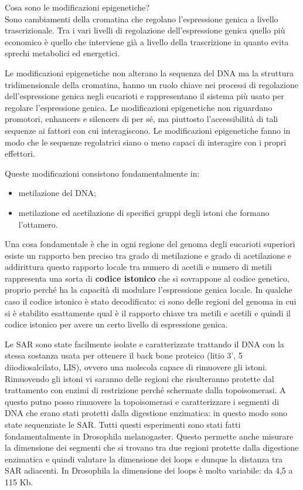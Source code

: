 \documentclass[11pt]{book}
\begin{document}
Cosa sono le modificazioni epigenetiche?\\
Sono cambiamenti della cromatina che regolano l’espressione genica a livello trascrizionale.
Tra i vari livelli di regolazione dell'espressione genica quello più economico è quello che interviene già a livello della trascrizione in quanto evita sprechi metabolici ed energetici.

Le modificazioni epigenetiche non alterano la sequenza del DNA ma la struttura tridimensionale della cromatina, hanno un ruolo chiave nei processi di regolazione dell’espressione genica negli eucarioti e rappresentano il sistema più usato per regolare l’espressione genica.
Le modificazioni epigenetiche non riguardano promotori, enhancers e silencers di per sé, ma piuttosto l’accessibilità di tali sequenze ai fattori con cui interagiscono. Le modificazioni epigenetiche fanno in modo che le sequenze regolatrici siano o meno capaci di interagire con i propri effettori.

Queste modificazioni consistono fondamentalmente in:
\begin{itemize}
\item metilazione del DNA;
\item metilazione ed acetilazione di specifici gruppi degli istoni che formano l’ottamero.
\end{itemize}

Una cosa fondamentale è che in ogni regione del genoma degli eucarioti superiori esiste un rapporto ben preciso tra grado di metilazione e grado di acetilazione e addirittura questo rapporto locale tra numero di acetili e numero di metili rappresenta una sorta di \textbf{codice istonico} che si sovrappone al codice genetico, proprio perché ha la capacità di modulare l’espressione genica locale. In qualche caso il codice istonico è stato decodificato: ci sono delle regioni del genoma in cui si è stabilito esattamente qual è il rapporto chiave tra metili e acetili e quindi il codice istonico per avere un certo livello di espressione genica. 

Le SAR sono state facilmente isolate e caratterizzate trattando il DNA con la stessa sostanza usata per ottenere il back bone proteico (litio 3’, 5 diiodiosalcilato, LIS), ovvero una molecola capace di rimuovere gli istoni. Rimuovendo gli istoni vi saranno delle regioni che risulteranno protette dal trattamento con enzimi di restrizione perché schermate dalla topoisomerasi. A questo putno posso rimuovere la topoisomerasi e caratterizzare i segmenti di DNA che erano stati protetti dalla digestione enzimatica: in questo modo sono state sequenziate le SAR.
Tutti questi esperimenti sono stati fatti fondamentalmente in Drosophila melanogaster.
Questo permette anche misurare la dimensione dei segmenti che si trovano tra due regioni protette dalla digestione enzimatica e quindi valutare la dimensione dei loops e dunque la distanza tra SAR adiacenti. In Drosophila la dimensione dei loops è molto variabile: da 4,5 a 115 Kb.
\end{document}
